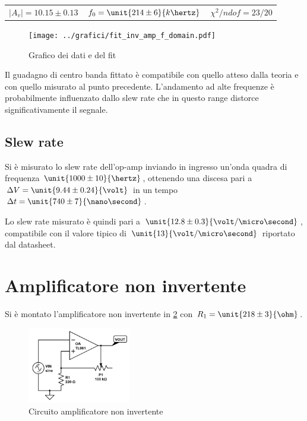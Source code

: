 \documentclass[10pt,a4paper]{article}
\begin{document}
\begin{table}[H]
	\centering
	\begin{tabular}{ccc}
	$|A_v| = 10.15 \pm 0.13$	&	$f_0 = \unit{214 \pm 6}{k\hertz}$	&	$\chi^2/ndof = 23 / 20$\\
	\end{tabular}
\end{table}

\begin{figure}[H]
	\centering
	\texttt{[image: ../grafici/fit\_inv\_amp\_f\_domain.pdf]}
	\caption{Grafico dei dati e del fit}
	\label{palle}
\end{figure}

Il guadagno di centro banda fittato è compatibile con quello atteso dalla teoria e con quello misurato al punto precedente.
L'andamento ad alte frequenze è probabilmente influenzato dallo slew rate che in questo range distorce significativamente il segnale.
\pagebreak
\subsection{Slew rate}
Si è misurato lo slew rate dell'op-amp inviando in ingresso un'onda quadra di frequenza $\unit{1000 \pm 10}{\hertz}$, ottenendo una discesa pari a  $\Delta V = \unit{9.44 \pm 0.24}{\volt}$ in un tempo $\Delta t = \unit{740 \pm 7}{\nano\second}$.

Lo slew rate misurato è quindi pari a $\unit{12.8 \pm 0.3}{\volt/\micro\second}$, compatibile con il valore tipico di $\unit{13}{\volt/\micro\second}$ riportato dal datasheet.


\section{Amplificatore non invertente}

Si è montato l'amplificatore non invertente in \figurename{\ref{circuito_non_inv}} con $R_1 = \unit{218 \pm 3}{\ohm}$.

\begin{figure}[H]
	\centering
	\includegraphics[width=0.4\textwidth]{../grafici/non_inv_amp_circuito.jpg}
	\caption{Circuito amplificatore non invertente}
	\label{circuito_non_inv}
\end{figure}
\end{document}
